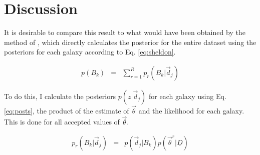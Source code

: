 \documentclass[12pt, onecolumn]{emulateapj}
\newcommand{\textul}{\underline}
\begin{document}

\section{Discussion}

It is desirable to compare this result to what would have been obtained by the method of \citet{she11}, which directly calculates the posterior for the entire dataset using the posteriors for each galaxy according to Eq. \ref{eq:sheldon}.

\begin{eqnarray}
\label{eq:sheldon}
p(B_{k}) &=& \sum_{r=1}^{R}p_{r}(B_{k}|\vec{d}_{j})
\end{eqnarray}

To do this, I calculate the posteriors $p(z|\vec{d}_{j})$ for each galaxy using Eq. \ref{eq:posts}, the product of the estimate of $\vec{\theta}$ and the likelihood for each galaxy.  This is done for all accepted values of $\vec{\theta}$.

\begin{eqnarray}
\label{eq:posts}
p_{r}(B_{k}|\vec{d}_{j}) &=& p(\vec{d}_{j}|B_{k})p(\vec{\theta}^{r}|\textul{D})
\end{eqnarray}


\end{document}
